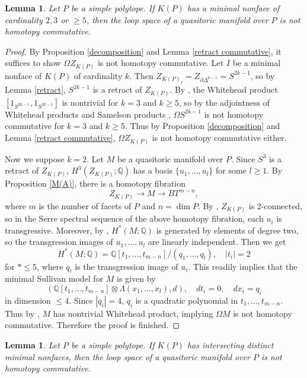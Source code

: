 \documentclass[a4paper]{amsart}
\numberwithin{equation}{section}
\newtheorem{lemma}[theorem]{Lemma}
\theoremstyle{definition}
\theoremstyle{remark}
\numberwithin{equation}{section}
\newcommand{\Q}{\mathbb{Q}}
\begin{document}
\begin{lemma}
  \label{minimal nonface}
  Let $P$ be a simple polytope. If $K(P)$ has a minimal nonface of cardinality $2,3$ or $\ge 5$, then the loop space of a quasitoric manifold over $P$ is not homotopy commutative.
\end{lemma}

\begin{proof}
  By Proposition \ref{decomposition} and Lemma \ref{retract commutative}, it suffices to show $\Omega Z_{K(P)}$ is not homotopy commutative. Let $I$ be a minimal nonface of $K(P)$ of cardinality $k$. Then $Z_{K(P)_I}=Z_{\partial\Delta^{k-1}}=S^{2k-1}$, so by Lemma \ref{retract}, $S^{2k-1}$ is a retract of $Z_{K(P)}$. By \cite{Ad}, the Whitehead product $[1_{S^{2k-1}},1_{S^{2k-1}}]$ is nontrivial for $k=3$ and $k\ge 5$, so by the adjointness of Whitehead products and Samelson products \cite{S}, $\Omega S^{2k-1}$ is not homotopy commutative for $k=3$ and $k\ge 5$. Thus by Proposition \ref{decomposition} and Lemma \ref{retract commutative}, $\Omega Z_{K(P)}$ is not homotopy commutative either.



  Now we suppose $k=2$. Let $M$ be a quasitoric manifold over $P$. Since $S^3$ is a retract of $Z_{K(P)}$, $H^3(Z_{K(P)};\Q)$ has a basis $\{ u_1,\ldots,u_l\}$ for some $l\ge 1$. By Proposition \ref{M(A)}, there is a homotopy fibration
  \[
    Z_{K(P)}\to M\to BT^{m-n},
  \]
  where $m$ is the number of facets of $P$ and $n=\dim P$. By \cite[Theorem 3.4.7]{BP}, $Z_{K(P)}$ is 2-connected, so in the Serre spectral sequence of the above homotopy fibration, each $u_i$ is transgressive. Moreover, by \cite[Proposition 3.10]{DJ}, $H^*(M;\Q)$ is generated by elements of degree two, so the transgression images of $u_1,\ldots,u_l$ are linearly independent. Then we get
  \[
    H^*(M;\Q)=\Q[t_1,\ldots,t_{m-n}]/(q_1,\ldots,q_l),\quad|t_i|=2
  \]
  for $*\le 5$, where $q_i$ is the transgression image of $u_i$. This readily implies that the minimal Sullivan model for $M$ is given by
  \[
    (\Q[t_1,\ldots,t_{m-n}]\otimes\Lambda(x_1,\ldots,x_l),d),\quad dt_i=0,\quad dx_i=q_i
  \]
  in dimension $\le 4$. Since $|q_i|=4$, $q_i$ is a quadratic polynomial in $t_1,\ldots,t_{m-n}$. Thus by \cite[Proposition 13.16]{FHT}, $M$ has nontrivial Whitehead product, implying $\Omega M$ is not homotopy commutative. Therefore the proof is finished.
\end{proof}



\begin{lemma}
  \label{nondisjoint}
  Let $P$ be a simple polytope. If $K(P)$ has intersecting distinct minimal nonfaces, then the loop space of a quasitoric manifold over $P$ is not homotopy commutative.
\end{lemma}
\end{document}
